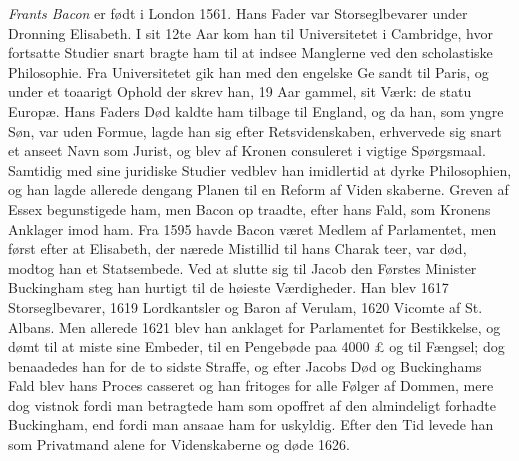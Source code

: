 \documentclass[12pt,a4paper]{book}
\begin{document}
\emph{Frants Bacon} er født i London 1561. Hans Fader
var Storseglbevarer under Dronning Elisabeth. I sit 12te Aar
kom han til Universitetet i Cambridge, hvor fortsatte Studier
snart bragte ham til at indsee Manglerne ved den scholastiske
Philosophie. Fra Universitetet gik han med den engelske Ge\-%
sandt til Paris, og under et toaarigt Ophold der skrev han,
19 Aar gammel, sit Værk: de statu Europæ. Hans Faders
Død kaldte ham tilbage til England, og da han, som yngre
Søn, var uden Formue, lagde han sig efter Retsvidenskaben,
erhvervede sig snart et anseet Navn som Jurist, og blev af
Kronen consuleret i vigtige Spørgsmaal. Samtidig med sine
juridiske Studier vedblev han imidlertid at dyrke Philosophien,
og han lagde allerede dengang Planen til en Reform af Viden\-%
skaberne. Greven af Essex begunstigede ham, men Bacon op\-%
traadte, efter hans Fald, som Kronens Anklager imod ham.
Fra 1595 havde Bacon været Medlem af Parlamentet, men
først efter at Elisabeth, der nærede Mistillid til hans Charak\-%
teer, var død, modtog han et Statsembede. Ved at slutte sig
til Jacob den Førstes Minister Buckingham steg han hurtigt
til de høieste Værdigheder. Han blev 1617 Storseglbevarer,
1619 Lordkantsler og Baron af Verulam, 1620 Vicomte af St.
Albans. Men allerede 1621 blev han anklaget for Parlamentet
for Bestikkelse, og dømt til at miste sine Embeder, til en
Pengebøde paa 4000 £ og til Fængsel; dog benaadedes han
for de to sidste Straffe, og efter Jacobs Død og Buckinghams
Fald blev hans Proces casseret og han fritoges for alle Følger
af Dommen, mere dog vistnok fordi man betragtede ham som
opoffret af den almindeligt forhadte Buckingham, end fordi
man ansaae ham for uskyldig. Efter den Tid levede han
som Privatmand alene for Videnskaberne og døde 1626.
\end{document}
